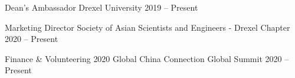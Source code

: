 
\begin{cvhonors}

  \cvhonor
  {Dean's Ambassador} %
  {Drexel University} %
  {2019 -- Present} %

  \cvhonor
  {Marketing Director} %
  {Society of Asian Scientists and Engineers - Drexel Chapter} %
  {2020 -- Present} %

  \cvhonor
  {Finance \& Volunteering} %
  {2020 Global China Connection Global Summit} %
  {2020 -- Present} %

\end{cvhonors}
